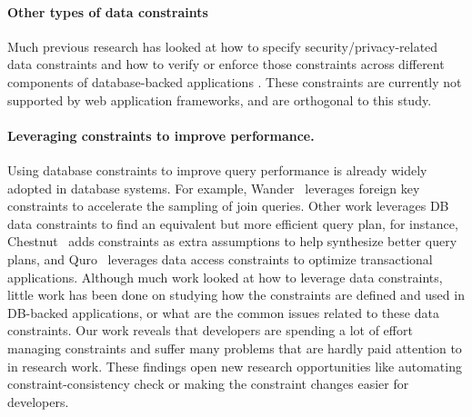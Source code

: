  \paragraph{\bf Other types of data constraints} Much previous research 
has looked at how to specify security/privacy-related data
constraints and how to verify or enforce those constraints across different
components of database-backed applications
\cite{karapanos2016verena, near2014derailer, yang2016precise, alkhalaf2012viewpoints}.
These constraints are currently not supported by web application
frameworks, and are orthogonal to this study.
  
 \paragraph{\bf Leveraging constraints to improve performance.} Using database constraints to improve query performance is already widely adopted in database systems. For example, Wander~\cite{li2016wander} leverages foreign key constraints to accelerate the sampling of join queries. Other work leverages DB data constraints to find an equivalent but more efficient query plan, for instance, Chestnut~\cite{cong2019chestnut} adds constraints as extra assumptions to help synthesize better query plans, and Quro~\cite{quro} leverages data access constraints to optimize transactional applications. Although much work looked at how to leverage data constraints, little work has been done on studying how the constraints are defined and used in DB-backed
applications, or what are the common issues related to these data constraints. Our work reveals that developers are spending a lot of effort managing constraints and suffer many problems that are hardly paid attention to in research work.
These findings open new research opportunities like automating constraint-consistency check or making the constraint changes easier for developers. 

